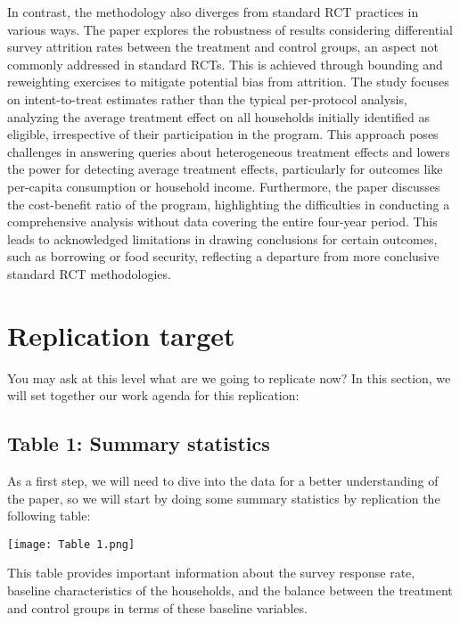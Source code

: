 \documentclass{article}
\begin{document}
In contrast, the methodology also diverges from standard RCT practices in various ways. The paper explores the robustness of results considering differential survey attrition rates between the treatment and control groups, an aspect not commonly addressed in standard RCTs. This is achieved through bounding and reweighting exercises to mitigate potential bias from attrition. The study focuses on intent-to-treat estimates rather than the typical per-protocol analysis, analyzing the average treatment effect on all households initially identified as eligible, irrespective of their participation in the program. This approach poses challenges in answering queries about heterogeneous treatment effects and lowers the power for detecting average treatment effects, particularly for outcomes like per-capita consumption or household income. Furthermore, the paper discusses the cost-benefit ratio of the program, highlighting the difficulties in conducting a comprehensive analysis without data covering the entire four-year period. This leads to acknowledged limitations in drawing conclusions for certain outcomes, such as borrowing or food security, reflecting a departure from more conclusive standard RCT methodologies.


\section{Replication target}
You may ask at this level what are we going to replicate now? In this section, we will set together our work agenda for this replication:  

\subsection{Table 1: Summary statistics}

As a first step, we will need to dive into the data for a better understanding of the paper, so we will start by doing some summary statistics by replication the following table: 

\texttt{[image: Table 1.png]}

\vspace{1cm}This table provides important information about the survey response rate, baseline characteristics of the households, and the balance between the treatment and control groups in terms of these baseline variables.
\end{document}
